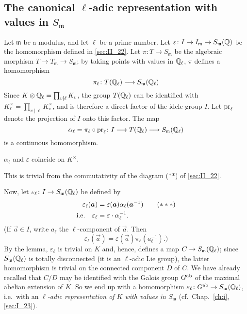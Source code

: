 \subsection{The canonical \texorpdfstring{$\ell$}{ℓ}-adic representation with
values in \texorpdfstring{$S_{\mathfrak{m}}$}{Sm}}
\label{sec:II_23}
Let $\mathfrak{m}$ be a modulus, and let $\ell$ be a prime number. Let
$\varepsilon\colon I \to I_{\mathfrak{m}} \to S_{\mathfrak{m}}(\Q)$ be the
homomorphism defined in \ref{sec:II_22}. Let $\pi\colon T \to S_{\mathfrak{m}}$
be the algebraic morphism $T \to T_{\mathfrak{m}} \to S_{\mathfrak{m}}$; by
taking points with values in $\Q_\ell$, $\pi$ defines a homomorphism
\[
	\pi_\ell \colon T(\Q_\ell) \longrightarrow S_{\mathfrak{m}}(\Q_\ell)
\]
Since $K \otimes \Q_\ell = \prod_{v\mid\ell} K_v$, the group $T(\Q_\ell)$ can
be identified with $K_\ell^\times = \prod_{v\mid\ell} K_v^\times$, and is
therefore a direct factor of the idele group $I$.  Let $\pr_\ell$ denote the
projection of $I$ onto this factor. The map
\[
	\alpha_\ell = \pi_\ell \circ \pr_\ell \colon I \longrightarrow T(\Q_\ell)
	\longrightarrow S_{\mathfrak{m}}(\Q_\ell)
\]
is a continuous homomorphism.
\begin{lem}
	$\alpha_\ell$ and $\varepsilon$ coincide on $K^\times$.
\end{lem}
This is trivial from the commutativity of the diagram (**) of \ref{sec:II_22}.

Now, let $\varepsilon_\ell \colon I \to
S_{\mathfrak{m}}(\Q_\ell)$ be defined by
\dpage
\begin{align}
	\varepsilon_\ell(\vec a) &= \varepsilon(\vec a) \alpha_\ell(\vec a^{-1})
	\tag{$***$}\label{eqn:II_23_star} \\
	\text{i.e.} \quad \varepsilon_\ell &= \varepsilon \cdot \alpha_\ell^{-1}.
	\notag
\end{align}
(If $\vec a \in I$, write $a_\ell$ the $\ell$-component of $\vec a$. Then
\[
	\varepsilon_\ell(\vec a) = \varepsilon(\vec a) \pi_\ell(a_\ell^{-1}).)
\]
By the lemma, $\varepsilon_\ell$ is trivial on $K$ and, hence, defines a map
$C \to S_{\mathfrak{m}}(\Q_\ell)$; since $S_{\mathfrak{m}}(\Q_\ell)$ is
totally disconnected (it is an $\ell$-adic Lie group), the latter homomorphism is
trivial on the connected component $D$ of $C$. We have already recalled that $C/D$
may be identified with the Galois group $\abcl G$ of the maximal abelian
extension of $K$. So we end up with a homomorphism $\varepsilon_\ell \colon
\abcl G \to S_{\mathfrak{m}}(\Q_\ell)$, i.e.\ with an \emph{$\ell$-adic
representation of $K$ with values in $S_{\mathfrak{m}}$} (cf.\ 
Chap.~\ref{ch:i}, \ref{sec:I_23}).

